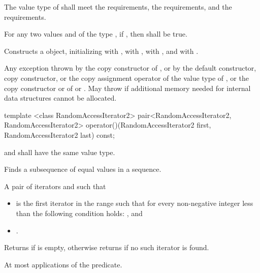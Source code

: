 \begin{itemdescr}
\pnum
\requires
The value type of  shall meet the  requirements, the  requirements, and the  requirements.

\pnum
\requires
For any two values  and  of the type , if , then  shall be true.

\pnum
\effects
Constructs a  object, initializing  with ,  with ,  with , and  with .

\pnum
\throws
Any exception thrown by the copy constructor of ,
or by the default constructor, copy constructor, or the copy assignment operator of the value type of ,
or the copy constructor or  of  or .
May throw  if additional memory needed for internal data structures cannot be allocated.
\end{itemdescr}

%
\begin{itemdecl}
template <class RandomAccessIterator2>
  pair<RandomAccessIterator2, RandomAccessIterator2>
    operator()(RandomAccessIterator2 first, RandomAccessIterator2 last) const;
\end{itemdecl}

\begin{itemdescr}
\pnum
\requires
{} and  shall have the same value type.

\pnum
\effects
Finds a subsequence of equal values in a sequence.

\pnum
\returns
A pair of iterators  and  such that
\begin{itemize}
\item {} is the first iterator
in the range  such that
for every non-negative integer  less than 
the following condition holds:
, and
\item {}.
\end{itemize}
Returns  if  is empty,
otherwise returns  if no such iterator is found.

\pnum
\complexity
At most  applications of the predicate.
\end{itemdescr}

